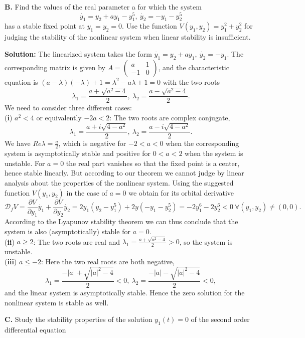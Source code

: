 \documentclass[11pt,a4paper,twoside]{article}
\begin{document}
	\textbf{B.} Find the values of the real parameter a for which the system
	$$
	\dot{y_1} = y_2 + ay_1 - y_1^5,\ \dot{y_2} = -y_1 - y_2^5
	$$
	has a stable fixed point at $y_1 = y_2 = 0$. Use the function $V(y_1, y_2) = y_1^2 + y_2^2$ for judging the stability of the nonlinear system when linear stability is insufficient.\par
	\textbf{Solution:} The linearized system takes the form $\dot{y_1} = y_2 + ay_1,\ \dot{y_2} = -y_1$. The corresponding matrix is given by
	$
	A = 
	\begin{pmatrix}
		a & 1\\
		-1 & 0
	\end{pmatrix}
	$,
	and the characteristic equation is $(a - \lambda)(-\lambda) + 1 = \lambda^2 - a\lambda + 1 = 0$ with the two roots
	$$
	\lambda_1 = \frac{a + \sqrt{a^2 - 4}}{2},\ \lambda_2 = \frac{a - \sqrt{a^2 - 4}}{2}.
	$$
	We need to consider three different cases:\\
	(\textbf{i}) $a^2 < 4$ or equivalently $-2 a < 2$: The two roots are complex conjugate,
	$$
	\lambda_1 = \frac{a + i\sqrt{4 - a^2}}{2},\ \lambda_2 = \frac{a - i\sqrt{4 - a^2}}{2}.
	$$
	We have $Re\lambda = \frac{a}{2}$, which is negative for $-2 < a < 0$ when the corresponding system is asymptotically stable and positive for $0 < a < 2$ when the system is unstable. For $a = 0$ the real part vanishes so that the fixed point is a center, hence stable linearly. But according to our theorem we cannot judge by linear analysis about the properties of the nonlinear system. Using the suggested function $V(y_1, y_2)$ in the case of $a = 0$ we obtain for its orbital derivative
	$$
	\mathcal{D}_fV = \frac{\partial V}{\partial y_1}\dot{y_1} + \frac{\partial V}{\partial y_2}\dot{y_2} = 2y_1(y_2 - y_1^5) + 2y(-y_1 - y_2^5) = -2y_1^6 - 2y_2^6 < 0\ \forall(y_1, y_2) \neq (0,0).
	$$
	According to the Lyapunov stability theorem we can thus conclude that the system is also (asymptotically) stable for $a = 0$.\\
	(\textbf{ii}) $a \geq 2$: The two roots are real and $\lambda_1 = \frac{a + \sqrt{a^2 - 4}}{2} > 0$, so the system is unstable.\\
	(\textbf{iii}) $a \leq -2$: Here the two real roots are both negative,
	$$
	\lambda_1 = \frac{-|a| + \sqrt{|a|^2 - 4}}{2} <0,\ \lambda_2 = \frac{-|a| - \sqrt{|a|^2 - 4}}{2} < 0,
	$$
	and the linear system is asymptotically stable. Hence the zero solution for the nonlinear system is stable as well.\par
	\textbf{C.} Study the stability properties of the solution $y_1(t) = 0$ of the second order differential equation
\end{document}
